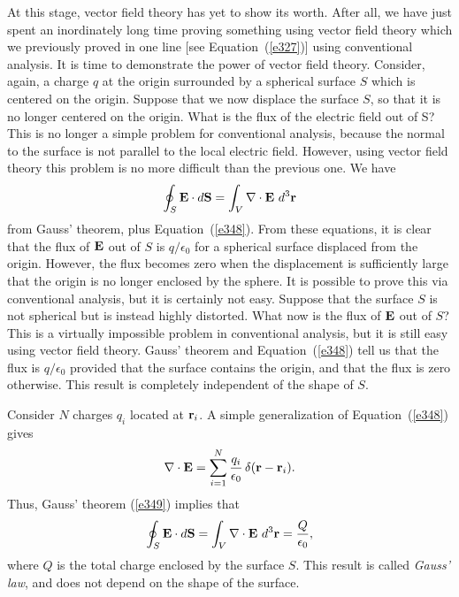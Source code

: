 At this stage,  vector field theory has yet to show its worth.
After all, we have just spent an inordinately long time proving something using
vector field theory which we 
previously proved in one line [see Equation~(\ref{e327})]  using conventional
analysis. It is time to demonstrate the power of vector field theory. 
Consider, again, a charge $q$ at the origin surrounded by a spherical surface $S$
which is centered on the origin. 
Suppose that we now displace the surface $S$, so that it is no longer centered
on the origin. What is the flux of the electric field out of S? This is no longer
a simple problem for conventional analysis, because the normal to the surface is
not  parallel to the local electric field. However, using  vector field theory
this problem is no more difficult than the previous one. We have
\begin{equation}\label{e349}
\oint_S {\bf E} \cdot d{\bf S} = \int_V \nabla\cdot {\bf E}\,\,d^3{\bf r}
\end{equation}
from Gauss' theorem,
plus Equation~(\ref{e348}).
From these equations, 
it is clear that the flux of ${\bf E}$ out of $S$ is $q/\epsilon_0$ for a
spherical surface displaced from the origin. However, the flux becomes zero when the
displacement is sufficiently large that the origin is no longer enclosed by
the sphere. 
It is possible to prove this via conventional analysis, but it is certainly not easy.
Suppose  that the surface $S$ is not spherical  but is
instead  highly distorted. What now is the flux of ${\bf E}$ out of $S$? This
is a virtually impossible problem in conventional analysis, but it is still easy
using vector field theory. Gauss' theorem and Equation~(\ref{e348}) tell us that
the flux is $q/\epsilon_0$ provided that the surface contains the origin,
and that the flux is zero otherwise. This result is completely independent of the shape of $S$.

Consider $N$ charges $q_i$ located at ${\bf r}_i$. A simple generalization of
Equation~(\ref{e348}) gives
\begin{equation}
\nabla\cdot {\bf E} = \sum_{i=1}^N
 \frac{q_i}{\epsilon_0}\, \delta({\bf r} - {\bf r}_i).
\end{equation}
Thus, Gauss' theorem (\ref{e349}) implies that
\begin{equation}\label{e351}
\oint_S {\bf E}\cdot d{\bf S} = \int_V \nabla\cdot{\bf E}\,\,
d^3{\bf r}= \frac{Q}{\epsilon_0},
\end{equation}
where $Q$ is the total charge enclosed by the surface $S$. This result is called
{\em Gauss' law}, and does
not depend on the shape of the surface. 

